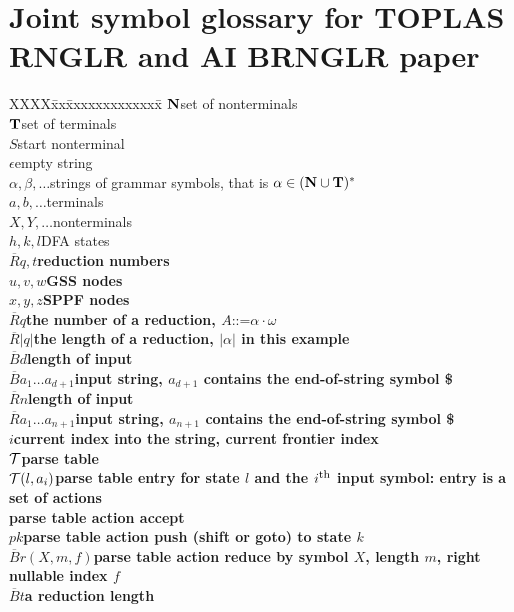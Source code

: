 \documentclass{article}
\newcommand{\NR}{\small\bf $\overline{R}$}
\newcommand{\NB}{\small\bf $\overline{B}$}
\begin{document}
\section*{\sf\bfseries Joint symbol glossary for TOPLAS RNGLR and AI BRNGLR paper}
\small
\begin{tabbing}
XXXX\=xx\=xxxxxxxxxxxxx\=\kill
\>$\bf N$\>\>set of nonterminals\\
\>$\bf T$\>\>set of terminals\\
\>$S$\>\>start nonterminal\\
\>$\epsilon$\>\>empty string\\
\>$\alpha,\beta, \dots$\>\>strings of grammar symbols, that is
$\alpha\in(\mbox{\bf N}\cup\mbox{\bf T})^*$\\
\>$a,b,\ldots$\>\>terminals\\
\>$X, Y, \ldots$\>\>nonterminals\\
\>$h,k,l$\>\>DFA states\\
\NR\>$q,t$\>\>reduction numbers\\
\>$u,v,w$\>\>GSS nodes\\
\>$x,y,z$\>\>SPPF nodes\\[2ex]

\NR\>$q$\>\>the number of a reduction, $A \mbox{::=}\alpha\cdot\omega$\\
\NR\>$|q|$\>\>the length of a reduction, $|\alpha|$ in this example\\
\NB\>$d$\>\>length of input\\
\NB\>$a_1 \ldots a_{d+1}$\>\>input string, $a_{d+1}$ contains the end-of-string
symbol \$\\
\NR\>$n$\>\>length of input\\
\NR\>$a_1 \ldots a_{n+1}$\>\>input string, $a_{n+1}$ contains the end-of-string
symbol \$\\
\>$i$\>\>current index into the string, current frontier index\\[2ex]

\>$\cal T$\>\>parse table\\
\>\>${\cal T}(l,a_i)$\>parse table entry for state $l$ and the
$i^{\mbox{\footnotesize th}}$ input symbol: entry is a set of actions\\ 
\>\>parse table action accept\\
\>\>$pk$\>parse table action push (shift or goto) to state $k$\\
\NB\>\>$r(X,m,f)$\>parse table action reduce by symbol $X$, length $m$,
right nullable index $f$\\
\NB\>\>$t$\>a reduction length\\



\end{tabbing}
\end{document}
